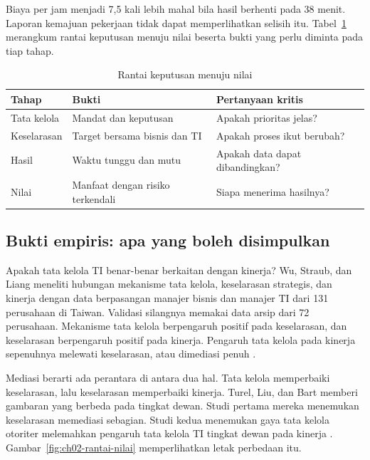 Biaya per jam menjadi 7,5 kali lebih mahal bila hasil berhenti pada 38 menit. Laporan kemajuan
pekerjaan tidak dapat memperlihatkan selisih itu. Tabel~\ref{tab:ch02-nilai} merangkum rantai
keputusan menuju nilai beserta bukti yang perlu diminta pada tiap tahap.

\begin{table}[!htb]
  \centering\small
  \caption{Rantai keputusan menuju nilai}\label{tab:ch02-nilai}
  \begin{tabularx}{\textwidth}{|>{\raggedright\arraybackslash}p{}|>{\raggedright\arraybackslash}X|>{\raggedright\arraybackslash}X|}
    \hline
    \textbf{Tahap} & \textbf{Bukti} & \textbf{Pertanyaan kritis} \\ \hline
    Tata kelola & Mandat dan keputusan & Apakah prioritas jelas? \\ \hline
    Keselarasan & Target bersama bisnis dan TI & Apakah proses ikut berubah? \\ \hline
    Hasil & Waktu tunggu dan mutu & Apakah data dapat dibandingkan? \\ \hline
    Nilai & Manfaat dengan risiko terkendali & Siapa menerima hasilnya? \\ \hline
  \end{tabularx}
\end{table}

\subsection*{Bukti empiris: apa yang boleh disimpulkan}

Apakah tata kelola TI benar-benar berkaitan dengan kinerja? Wu, Straub, dan Liang meneliti
hubungan mekanisme tata kelola, keselarasan strategis, dan kinerja dengan data berpasangan
manajer bisnis dan manajer TI dari 131 perusahaan di Taiwan. Validasi silangnya memakai data
arsip dari 72 perusahaan. Mekanisme tata kelola berpengaruh positif pada keselarasan, dan
keselarasan berpengaruh positif pada kinerja. Pengaruh tata kelola pada kinerja sepenuhnya
melewati keselarasan, atau dimediasi penuh \cite{wu2015}.

Mediasi berarti ada perantara di antara dua hal. Tata kelola memperbaiki keselarasan, lalu
keselarasan memperbaiki kinerja. Turel, Liu, dan Bart memberi gambaran yang berbeda pada tingkat
dewan. Studi pertama mereka menemukan keselarasan memediasi sebagian. Studi kedua menemukan gaya
tata kelola otoriter melemahkan pengaruh tata kelola TI tingkat dewan pada kinerja
\cite{c02-turel2017}.
Gambar~\ref{fig:ch02-rantai-nilai} memperlihatkan letak perbedaan itu.

